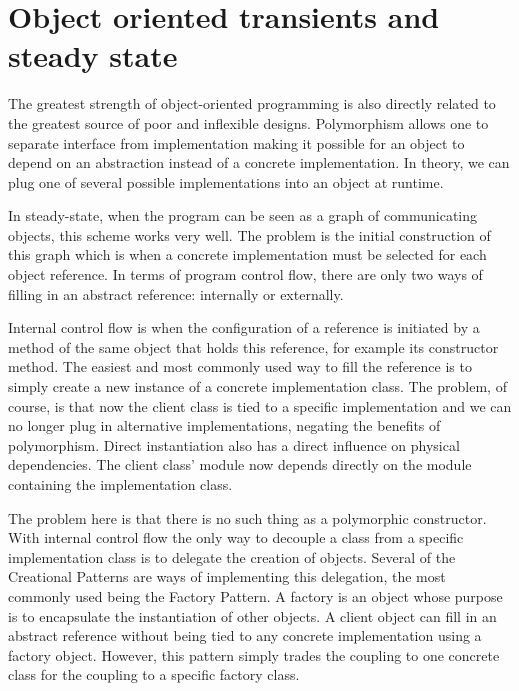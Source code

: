 \section{Object oriented transients and steady state}

The greatest strength of object-oriented programming is also directly related to the greatest source of poor and inflexible
designs. Polymorphism allows one to separate interface from implementation making it possible for an object to depend
on an abstraction instead of a concrete implementation. In theory, we can plug one of several possible implementations
into an object at runtime. 

In steady-state, when the program can be seen as a graph of communicating objects, this scheme works very well. The
problem is the initial construction of this graph which is when a concrete implementation must be selected for
each object reference. In terms of program control flow, there are only two ways of filling in an abstract reference:
internally or externally.

Internal control flow is when the configuration of a reference is initiated by a method of the same object that holds
this reference, for example its constructor method. The easiest and most commonly used way to fill the reference is
to simply create a new instance of a concrete implementation class. The problem, of course, is that now the client
class is tied to a specific implementation and we can no longer plug in alternative implementations, negating the
benefits of polymorphism. Direct instantiation also has a direct influence on physical dependencies. The client
class' module now depends directly on the module containing the implementation class.

The problem here is that there is no such thing as a polymorphic constructor. With internal control flow
the only way to decouple a class from a specific implementation class is to delegate the creation of objects.
Several of the Creational Patterns \cite{Gamma} are ways of implementing this delegation, the most commonly
used being the Factory Pattern. A factory is an object whose purpose is to encapsulate the instantiation of
other objects. A client object can fill in an abstract reference without being tied to any concrete implementation
using a factory object. However, this pattern simply trades the coupling to one concrete class for the coupling to
a specific factory class.

